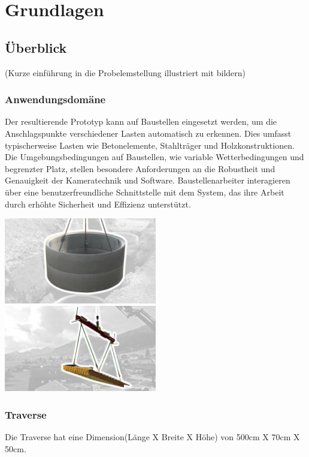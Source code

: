 \section{Grundlagen}

\subsection{Überblick}
(Kurze einführung in die Probelemstellung illustriert mit bildern)
\subsubsection{Anwendungsdomäne}

Der resultierende Prototyp kann auf Baustellen eingesetzt werden, um die Anschlagspunkte verschiedener Lasten automatisch zu erkennen. Dies umfasst typischerweise Lasten wie Betonelemente, Stahlträger und Holzkonstruktionen. Die Umgebungsbedingungen auf Baustellen, wie variable Wetterbedingungen und begrenzter Platz, stellen besondere Anforderungen an die Robustheit und Genauigkeit der Kameratechnik und Software. Baustellenarbeiter interagieren über eine benutzerfreundliche Schnittstelle mit dem System, das ihre Arbeit durch erhöhte Sicherheit und Effizienz unterstützt.


\includegraphics[width=0.5\textwidth]{graphics/Betonelement.jpg}\hfill%
\includegraphics[width=0.5\textwidth]{graphics/Traverse.jpg}



\subsubsection{Traverse}
Die Traverse hat eine Dimension(Länge X Breite X Höhe) von 500cm X 70cm X 50cm.

